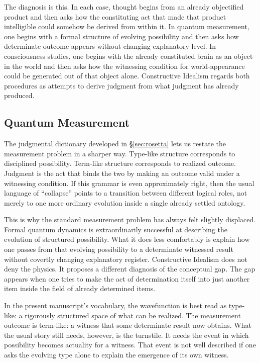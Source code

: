 \documentclass[11pt,a4paper]{article}
\theoremstyle{plain}
\theoremstyle{definition}
\theoremstyle{remark}
\begin{document}
The diagnosis is this.
In each case, thought begins from an already objectified product and then asks how the constituting act that made that product intelligible could somehow be derived from within it.
In quantum measurement, one begins with a formal structure of evolving possibility and then asks how determinate outcome appears without changing explanatory level.
In consciousness studies, one begins with the already constituted brain as an object in the world and then asks how the witnessing condition for world-appearance could be generated out of that object alone.
Constructive Idealism regards both procedures as attempts to derive judgment from what judgment has already produced.

\subsection{Quantum Measurement}
\label{subsec:measurement}

The judgmental dictionary developed in \S\ref{sec:rosetta} lets us restate the measurement problem in a sharper way.
Type-like structure corresponds to disciplined possibility.
Term-like structure corresponds to realized outcome.
Judgment is the act that binds the two by making an outcome valid under a witnessing condition.
If this grammar is even approximately right, then the usual language of ``collapse'' points to a transition between different logical roles, not merely to one more ordinary evolution inside a single already settled ontology.

This is why the standard measurement problem has always felt slightly displaced.
Formal quantum dynamics is extraordinarily successful at describing the evolution of structured possibility.
What it does less comfortably is explain how one passes from that evolving possibility to a determinate witnessed result without covertly changing explanatory register.
Constructive Idealism does not deny the physics.
It proposes a different diagnosis of the conceptual gap.
The gap appears when one tries to make the act of determination itself into just another item inside the field of already determined items.

In the present manuscript's vocabulary, the wavefunction is best read as type-like: a rigorously structured space of what can be realized.
The measurement outcome is term-like: a witness that some determinate result now obtains.
What the usual story still needs, however, is the turnstile.
It needs the event in which possibility becomes actuality for a witness.
That event is not well described if one asks the evolving type alone to explain the emergence of its own witness.
\end{document}
